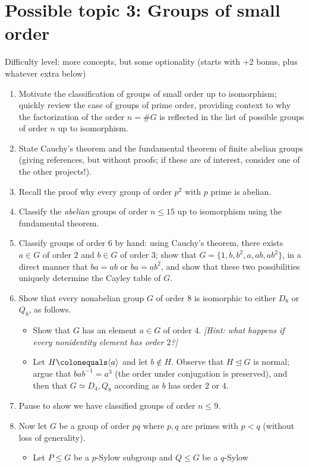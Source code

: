 \documentclass[11pt, reqno]{amsart}
\begin{document}
\section*{Possible topic 3: Groups of small order}
Difficulty level: more concepts, but some optionality (starts with +2 bonus, plus 
whatever extra below)
\begin{enumerate}
\item Motivate the classification of groups of small order up to isomorphism; 
quickly review the case of groups of prime order, providing context to why the 
factorization of the order $n=\#G$ is reflected in the list of possible groups of 
order $n$ up to isomorphism.  
\item State Cauchy's theorem and the fundamental theorem of finite abelian groups 
(giving references, but without proofs; if these are of interest, consider one of 
the other projects!).  
\item Recall the proof why every group of order $p^2$ with $p$ prime is abelian.  
\item Classify the \emph{abelian} groups of order $n \leq 15$ up to isomorphism 
using the fundamental theorem.
\item Classify groups of order $6$ by hand: using Cauchy's theorem, there exists $a
\in G$ of order $2$ and $b \in G$ of order $3$;
  show that $G=\{1,b,b^2,a,ab,ab^2\}$, in a direct manner that
  $ba=ab$ or $ba=ab^2$, and show that these two possibilities uniquely determine
  the Cayley table of $G$.
\item Show that every nonabelian group $G$ of order $8$ is isomorphic to either 
$D_8$ or $Q_8$, as follows.
\begin{itemize}
\item Show that $G$ has an element $a \in G$ of order $4$.  \emph{[Hint: what 
happens if every nonidentity element has order $2$?]}
\item Let $H \colonequals \langle a \rangle$ and let $b \not \in H$.  Observe that 
$H \trianglelefteq G$ is normal; argue that $bab^{-1}=a^3$ (the order under 
conjugation is preserved), and then that $G \simeq D_4,Q_8$ according as $b$ has 
order $2$ or $4$.  
\end{itemize}
\item Pause to show we have classified groups of order $n \leq 9$.  
\item Now let $G$ be a group of order $pq$ where $p,q$ are primes with $p < q$ 
(without loss of generality).  
\begin{itemize}
\item Let $P \leq G$ be a $p$-Sylow subgroup and $Q \leq G$ be a $q$-Sylow 

\end{itemize}
\end{enumerate}
\end{document}
